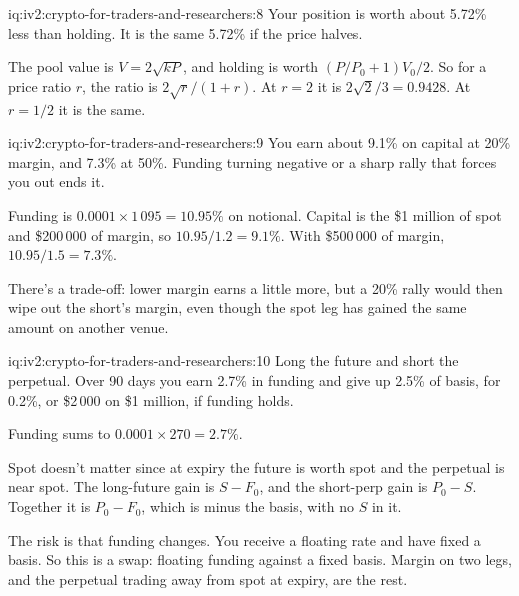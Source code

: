 \begin{solution}{iq:iv2:crypto-for-traders-and-researchers:8}
Your position is worth about 5.72\% less than holding. It is the same 5.72\% if the price halves.

The pool value is $V = 2\sqrt{kP}$, and holding is worth $(P/P_0 + 1)V_0/2$. So for a price ratio $r$, the ratio is $2\sqrt{r}/(1 + r)$. At $r = 2$ it is $2\sqrt{2}/3 = 0.9428$. At $r = 1/2$ it is the same.

\end{solution}

\begin{solution}{iq:iv2:crypto-for-traders-and-researchers:9}
You earn about 9.1\% on capital at 20\% margin, and 7.3\% at 50\%. Funding turning negative or a sharp rally that forces you out ends it.

Funding is $0.0001 \times 1\,095 = 10.95\%$ on notional. Capital is the \$1 million of spot and \$200\,000 of margin, so $10.95/1.2 = 9.1\%$. With \$500\,000 of margin, $10.95/1.5 = 7.3\%$.

There's a trade-off: lower margin earns a little more, but a 20\% rally would then wipe out the short's margin, even though the spot leg has gained the same amount on another venue.

\end{solution}

\begin{solution}{iq:iv2:crypto-for-traders-and-researchers:10}
Long the future and short the perpetual. Over 90 days you earn 2.7\% in funding and give up 2.5\% of basis, for 0.2\%, or \$2\,000 on \$1 million, if funding holds.

Funding sums to $0.0001 \times 270 = 2.7\%$.

Spot doesn't matter since at expiry the future is worth spot and the perpetual is near spot. The long-future gain is $S - F_0$, and the short-perp gain is $P_0 - S$. Together it is $P_0 - F_0$, which is minus the basis, with no $S$ in it.

The risk is that funding changes. You receive a floating rate and have fixed a basis. So this is a swap: floating funding against a fixed basis. Margin on two legs, and the perpetual trading away from spot at expiry, are the rest.

\end{solution}

